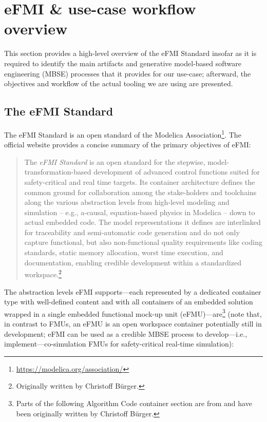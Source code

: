 \section{eFMI \& use-case workflow overview}\label{sec:efmi-and-use-case-workflow-overview}

This section provides a high-level overview of the eFMI Standard insofar as it is required to identify the main artifacts and generative model-based software engineering (MBSE) processes that it provides for our use-case; afterward, the objectives and workflow of the actual tooling we are using are presented.

\subsection{The eFMI Standard}\label{sec:efmi-standard}

The eFMI Standard \cite{eFMI_Standard} is an open standard of the Modelica Association\regtm{}\footnote{\tiny{\url{https://modelica.org/association/}}}. The official website provides a concise summary of the primary objectives of eFMI:
\blockquote{The \textit{eFMI\regtm{} Standard} is an open standard for the stepwise, model-transformation-based development of advanced control functions suited for safety-critical and real time targets. Its container architecture defines the common ground for collaboration among the stake-holders and toolchains along the various abstraction levels from high-level modeling and simulation -- e.g., a-causal, equation-based physics in Modelica -- down to actual embedded code. The model representations it defines are interlinked for traceability and semi-automatic code generation and do not only capture functional, but also non-functional quality requirements like coding standards, static memory allocation, worst time execution, and documentation, enabling credible development within a standardized workspace.\footnote{Originally written by Christoff Bürger.}}

\noindent{}The abstraction levels eFMI supports---each represented by a dedicated container type with well-defined content and with all containers of an embedded solution wrapped in a single embedded functional mock-up unit (eFMU)---are\footnote{Parts of the following Algorithm Code container section are from \cite{Kamp2025} and have been originally written by Christoff Bürger.} (note that, in contrast to FMUs, an eFMU is an open workspace container potentially still in development; eFMI can be used as a credible MBSE process to develop---i.e., implement---co-simulation FMUs for safety-critical real-time simulation):

